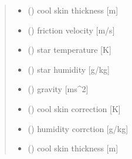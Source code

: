 \documentclass[letterpaper,10pt,english]{sphinxmanual}
\begin{document}
\begin{fulllineitems}
\begin{quote}
\begin{description}
\begin{itemize}
\item {} 
\sphinxAtStartPar
{} () \textendash{} cool skin thickness           {[}m{]}

\item {} 
\sphinxAtStartPar
{} () \textendash{} friction velocity             {[}m/s{]}

\item {} 
\sphinxAtStartPar
{} () \textendash{} star temperature              {[}K{]}

\item {} 
\sphinxAtStartPar
{} () \textendash{} star humidity                 {[}g/kg{]}

\item {} 
\sphinxAtStartPar
{} () \textendash{} gravity                      {[}ms\textasciicircum{}\sphinxhyphen{}2{]}

\end{itemize}

\sphinxAtStartPar
\begin{itemize}
\item {} 
\sphinxAtStartPar
{} () \textendash{} cool skin correction         {[}K{]}

\item {} 
\sphinxAtStartPar
{} () \textendash{} humidity corrction            {[}g/kg{]}

\item {} 
\sphinxAtStartPar
{} () \textendash{} cool skin thickness           {[}m{]}

\end{itemize}


\end{description}\end{quote}

\end{fulllineitems}

\end{document}
